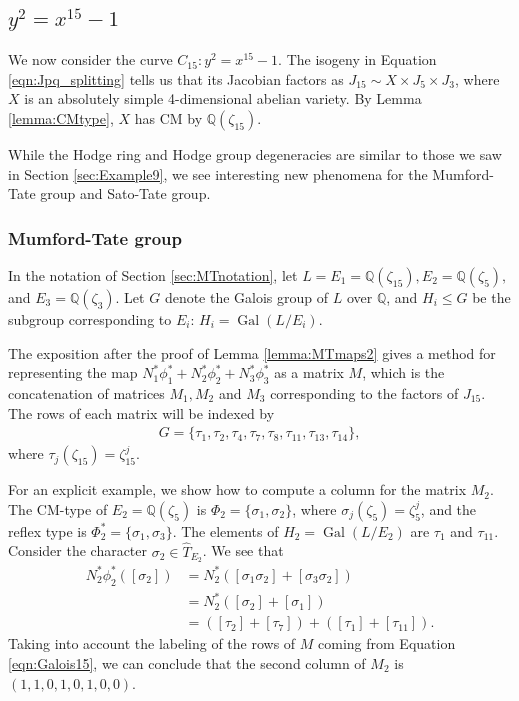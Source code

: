 \documentclass[reqno, oneside, 12pt]{amsart}
\DeclareMathOperator{\Gal}{Gal}
\newcommand{\Q}{\mathbb{Q}}
\theoremstyle{remark}
\numberwithin{equation}{section}
\begin{document}
\subsection{$y^2=x^{15}-1$}\label{sec:Example15}



We now consider the curve $C_{15}\colon y^2=x^{15}-1$. The isogeny in Equation \eqref{eqn:Jpq_splitting} tells us that its Jacobian factors as $J_{15}\sim X\times J_5 \times J_3 $, where $X$ is an absolutely simple  4-dimensional abelian variety. By  Lemma \ref{lemma:CMtype}, $X$ has CM by $\Q(\zeta_{15})$. 

While the Hodge ring and Hodge group degeneracies are similar to those we saw in Section \ref{sec:Example9}, we see interesting new phenomena for the Mumford-Tate group and Sato-Tate group. 

\subsubsection{Mumford-Tate group}\label{sec:Example15MT}
In the notation of Section \ref{sec:MTnotation}, let $L=E_1=\Q(\zeta_{15}), E_2=\Q(\zeta_5),$ and $ E_3=\Q(\zeta_3)$. Let $G$ denote the Galois group of $L$ over $\Q$, and $H_i\leq G$ be the subgroup corresponding to $E_i$:  $H_i=\Gal(L/E_i)$. 

The exposition after the proof of Lemma \ref{lemma:MTmaps2} gives a method for representing the map $N_1^* \phi_1^*+N_2^* \phi_2^*+N_3^* \phi_3^*$ as a matrix $M$, which is the concatenation of matrices $M_1,M_2$ and $M_3$ corresponding to the factors of $J_{15}$. The rows of each matrix will be indexed by \begin{align}\label{eqn:Galois15}
G=\{\tau_1, \tau_2, \tau_4, \tau_7,\tau_8,\tau_{11},\tau_{13},\tau_{14}\},    
\end{align}
where $\tau_j(\zeta_{15})=\zeta_{15}^j$. 

For an explicit example, we show how to compute a column for the matrix $M_2$. The CM-type of $E_2=\Q(\zeta_5)$ is $\Phi_2=\{\sigma_1, \sigma_2\}$, where $\sigma_j(\zeta_5)=\zeta_5^j$, and  the reflex type is $\Phi_2^*=\{\sigma_1, \sigma_3\}$. The elements of $H_2=\Gal(L/E_2)$ are $\tau_1$ and $\tau_{11}$. Consider the character $\sigma_2\in\widehat{T}_{E_2}$. We see that
\begin{align*}
    N_2^*\phi_2^*([\sigma_2])&=N_2^*([\sigma_1\sigma_2]+[\sigma_3\sigma_2])\\
                            &=N_2^*([\sigma_2]+[\sigma_1])\\
                            &=([\tau_2]+[\tau_7])+([\tau_1]+[\tau_{11}]).
\end{align*}
Taking into account the labeling of the rows of $M$ coming from Equation \eqref{eqn:Galois15}, we can conclude that the second column of $M_2$ is $(1,1,0,1,0,1,0,0)$.
\end{document}
